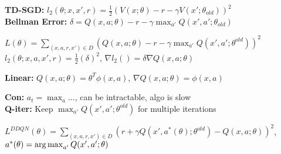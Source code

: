 
\textbf{TD-SGD:} $l_2(\theta; x,x',r) = \frac{1}{2}(V(x;\theta) - r - \gamma V(x'; \theta_{old}))^2$\\
\textbf{Bellman Error:} $\delta = Q(x,a;\theta) - r - \gamma \max_{a'} Q(x',a'; \theta_{old})$\\
\begin{comment}
	This can be seen as mean squared errors with labels $r - \gamma(x';\theta_{old})$. The labels change as we gain more experience\\
	We can now learn a parameterised function to learn V. This can be done with a linear function approximation $Q(x,a;\theta) = \theta^T \phi(x,a)$, or via a neural network\\
\end{comment}

$L(\theta) = \sum_{(x,a,r,x') \in D} (Q(x,a;\theta) - r - \gamma \max_{a'} Q(x',a'; \theta^{old}))^2$\\

$l_2(\theta; x,a,x',r) = \frac{1}{2}(\delta)^2$, $\nabla l_2() = \delta\nabla Q(x,a; \theta)$

\textbf{Linear:} $Q(x,a;\theta) = \theta^T \phi(x,a)$, $\nabla Q(x,a;\theta) = \phi(x,a)$\\
\begin{comment}
	We assume the old Q value, parameterised by the old parameters, to be constant. This is the bootstrapping idea.\\
	
\end{comment}

\textbf{Con:} $a_t = \max_a ...$, can be intractable, algo is slow\\
\textbf{Q-iter:} Keep $\max_{a'} Q(x',a'; \theta^{old})$ for multiple iterations\\
\begin{comment}
	The labels keep changing, this introduces stability issues in practice. By keeping a cloned network, the target labels don't jump around as much, leading to accelerated performance.\\
\end{comment}


$L^{DDQN}(\theta) = \sum_{(x,a,r,x') \in D} (r + \gamma Q(x', a^*(\theta); \theta^{old}) - Q(x,a;\theta))^2$, $a^*(\theta) = \operatorname*{arg\,max}_{a'} Q(x', a';\theta)$\\
\begin{comment}
	\textbf{Maximation Bias:} The Q function of the target network seeks the max over all possible actions. It seeks this maximum on an already estimated quantity, which can lead to large bias.\\
	By using two seperate networks, the argmax can be obtained unbiased from the other network. There are multiple variations of this.\\
	\textbf{Double:} We assume here that two different networks are maintained, one for optimizing the targets, and one for optimizing the value.\\
	We have to backprop the a-network as well now.\\
\end{comment}

